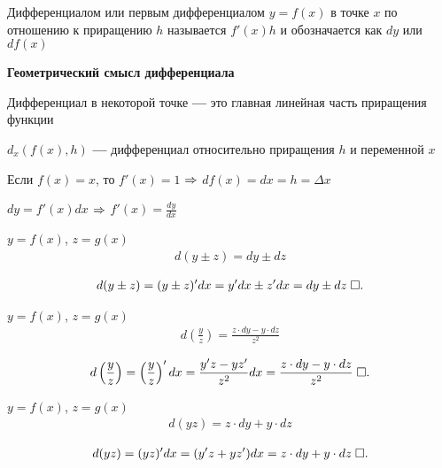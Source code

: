 \documentclass{article}
\begin{document}


Дифференциалом или первым дифференциалом $y=f(x)$ в точке $x$ по отношению к приращению $h$ называется $f'(x)h$ и обозначается как $dy$ или $df(x)$

\textbf{Геометрический смысл дифференциала}

Дифференциал в некоторой точке \textbf{---} это главная линейная часть  приращения функции

$d_x(f(x), h)$ \textbf{---} дифференциал относительно приращения $h$ и переменной $x$


Если $f(x)=x$, то $f'(x)=1$ $\Rarr$ $df(x)=dx=h=\Delta x$

$dy=f'(x)dx$ $\Rarr$ $f'(x)=\frac{dy}{dx}$



\theorem

$y=f(x)$, $z=g(x)$
\begin{align*}
	d(y\pm z)=dy\pm dz
\end{align*}

\proof
\begin{align*}
	d(y\pm z)=(y\pm z)'dx =y'dx\pm z'dx=dy\pm dz\qed
\end{align*}

\theorem

$y=f(x)$, $z=g(x)$
\begin{align*}
	d\left(\frac{y}{z}\right)=\frac{z \cdot dy-y \cdot dz}{z^{2}}
\end{align*}

\proof
\begin{align*}
	d\left(\frac{y}{z}\right)=\left(\frac{y}{z}\right)'dx =\frac{y'z-yz'}{z^{2}}dx=\frac{z \cdot dy-y \cdot dz}{z^{2}}\qed
\end{align*}

\theorem

$y=f(x)$, $z=g(x)$
\begin{align*}
	d(yz)=z \cdot dy+y \cdot dz
\end{align*}

\proof
\begin{align*}
	d(yz)=(yz)'dx=(y'z+yz')dx=z \cdot dy+y \cdot dz\qed
\end{align*}

\pagebreak

\theorem
\end{document}
